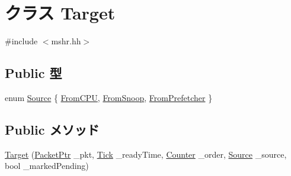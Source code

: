 \hypertarget{classMSHR_1_1Target}{
\section{クラス Target}
\label{classMSHR_1_1Target}
}


{\ttfamily \#include $<$mshr.hh$>$}\subsection*{Public 型}
\begin{DoxyCompactItemize}
\item 
enum \hyperlink{classMSHR_1_1Target_a176e1eca2d1e3d1c6a064340bc6a351e}{Source} \{ \hyperlink{classMSHR_1_1Target_a176e1eca2d1e3d1c6a064340bc6a351ead87ddc653bf916825f87a824895e88f7}{FromCPU}, 
\hyperlink{classMSHR_1_1Target_a176e1eca2d1e3d1c6a064340bc6a351eaa3edd380596b2be1636c4a8b7f18611f}{FromSnoop}, 
\hyperlink{classMSHR_1_1Target_a176e1eca2d1e3d1c6a064340bc6a351ea63c0c00defe35fdf63539ff5fff462c7}{FromPrefetcher}
 \}
\end{DoxyCompactItemize}
\subsection*{Public メソッド}
\begin{DoxyCompactItemize}
\item 
\hyperlink{classMSHR_1_1Target_aabb8a1de346c61cffba6edb40bf285a6}{Target} (\hyperlink{classPacket}{PacketPtr} \_\-pkt, \hyperlink{base_2types_8hh_a5c8ed81b7d238c9083e1037ba6d61643}{Tick} \_\-readyTime, \hyperlink{base_2types_8hh_ae1475755791765b8e6f6a8bb091e273e}{Counter} \_\-order, \hyperlink{classMSHR_1_1Target_a176e1eca2d1e3d1c6a064340bc6a351e}{Source} \_\-source, bool \_\-markedPending)
\end{DoxyCompactItemize}
